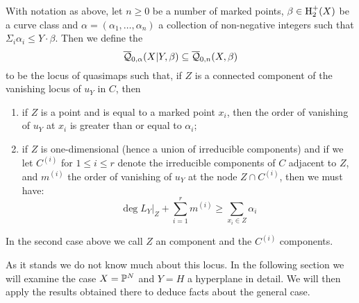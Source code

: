 \begin{definition} With notation as above, let $n \geq 0$ be a number of marked points, $\beta \in \operatorname{H}_2^+(X)$ be a curve class and $\alpha=(\alpha_1, \ldots, \alpha_n)$ a collection of non-negative integers such that $\Sigma_i \alpha_i \leq Y \cdot \beta$. Then we define the 
\begin{equation*} \overline{\mathcal Q}_{0,\alpha}(X|Y,\beta) \subseteq \overline{\mathcal Q}_{0,n}(X,\beta) \end{equation*}
to be the locus of quasimaps such that, if $Z$ is a connected component of the vanishing locus of $u_Y$ in $C$, then
\begin{enumerate}
\item if $Z$ is a point and is equal to a marked point $x_i$, then the order of vanishing of $u_Y$ at $x_i$ is greater than or equal to $\alpha_i$;
\item if $Z$ is one-dimensional (hence a union of irreducible components) and if we let $C^{(i)}$ for $1 \leq i \leq r$ denote the irreducible components of $C$ adjacent to $Z$, and $m^{(i)}$ the order of vanishing of $u_Y$ at the node $Z \cap C^{(i)}$, then we must have:
\begin{equation} \label{Relative quasimap internal component inequality} \deg L_Y|_Z + \sum_{i=1}^r m^{(i)} \geq \sum_{x_i \in Z} \alpha_i \end{equation}
\end{enumerate}
\end{definition}

\begin{remark}In the second case above we call $Z$ an  component and the $C^{(i)}$  components.\end{remark}

As it stands we do not know much about this locus. In the following section we will examine the case $X=\mathbb P^N$ and $Y=H$ a hyperplane in detail. We will then apply the results obtained there to deduce facts about the general case.